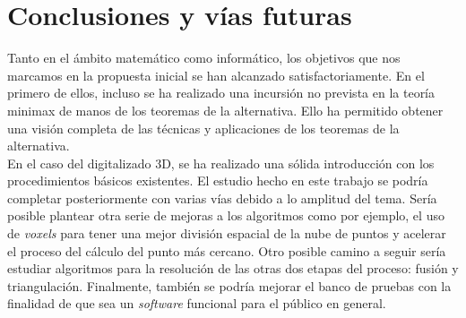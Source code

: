 \chapter{Conclusiones y vías futuras}
Tanto en el ámbito matemático como informático, los objetivos que nos marcamos en la propuesta inicial se han alcanzado satisfactoriamente. En el primero de ellos, incluso se ha realizado una incursión no prevista en la teoría minimax de manos de los teoremas de la alternativa. Ello ha permitido obtener una visión completa de las técnicas y aplicaciones de los teoremas de la alternativa. \\

En el caso del digitalizado 3D, se ha realizado una sólida introducción con los procedimientos básicos existentes. El estudio hecho en este trabajo se podría completar posteriormente con varias vías debido a lo amplitud del tema. Sería posible plantear otra serie de mejoras a los algoritmos como por ejemplo, el uso de \textit{voxels} para tener una mejor división espacial de la nube de puntos y acelerar el proceso del cálculo del punto más cercano. Otro posible camino a seguir sería estudiar algoritmos para la resolución de las otras dos etapas del proceso: fusión y triangulación. Finalmente, también se podría mejorar el banco de pruebas con la finalidad de que sea un \textit{software} funcional para el público en general.